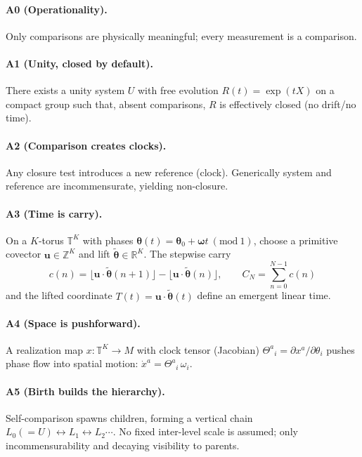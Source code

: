 \documentclass[11pt]{article}
\newcommand{\TT}{\mathbb T}
\newcommand{\RR}{\mathbb R}
\newcommand{\ZZ}{\mathbb Z}
\newcommand{\vect}[1]{\boldsymbol{#1}}
\begin{document}
\paragraph{A0 (Operationality).}
Only comparisons are physically meaningful; every measurement is a comparison.

\paragraph{A1 (Unity, closed by default).}
There exists a unity system $U$ with free evolution $R(t)=\exp(tX)$ on a compact group such that, absent comparisons, $R$ is effectively closed (no drift/no time).

\paragraph{A2 (Comparison creates clocks).}
Any closure test introduces a new reference (clock). Generically system and reference are incommensurate, yielding non-closure.

\paragraph{A3 (Time is carry).}
On a $K$-torus $\TT^K$ with phases $\vect\theta(t)=\vect\theta_0+\vect\omega t\ (\mathrm{mod}\ 1)$, choose a primitive covector $\vect u\in\ZZ^K$ and lift $\tilde{\vect\theta}\in\RR^K$.
The stepwise carry
\begin{equation}
c(n)=\Big\lfloor \vect u\!\cdot\!\tilde{\vect\theta}(n{+}1)\Big\rfloor-\Big\lfloor \vect u\!\cdot\!\tilde{\vect\theta}(n)\Big\rfloor,\qquad
C_N=\sum_{n=0}^{N-1}c(n)
\end{equation}
and the lifted coordinate $T(t)=\vect u\!\cdot\!\tilde{\vect\theta}(t)$ define an emergent linear time.

\paragraph{A4 (Space is pushforward).}
A realization map $x:\TT^K\to M$ with clock tensor (Jacobian) $\Theta^a{}_i=\partial x^a/\partial\theta_i$ pushes phase flow into spatial motion: $\dot x^a=\Theta^a{}_i\,\omega_i$.

\paragraph{A5 (Birth builds the hierarchy).}
Self-comparison spawns children, forming a vertical chain $L_0(=U)\leftrightarrow L_1\leftrightarrow L_2\cdots$. No fixed inter-level scale is assumed; only incommensurability and decaying visibility to parents.
\end{document}
